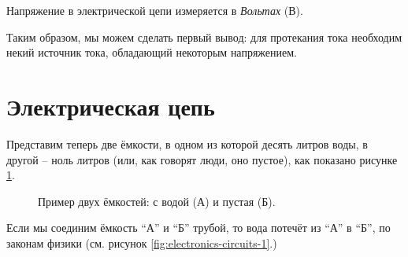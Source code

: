 \documentclass[a4paper,twoside]{book}
\begin{document}
Напряжение в электрической цепи измеряется в \emph{Вольтах} (В).

Таким образом, мы можем сделать первый вывод: для протекания тока необходим
некий источник тока, обладающий некоторым напряжением.

\section{Электрическая цепь}

Представим теперь две ёмкости, в одном из которой десять литров воды, в другой
-- ноль литров (или, как говорят люди, оно пустое), как показано рисунке
\ref{fig:electronics-circuits-0}.

\begin{figure}[ht]
  \centering
  \caption{Пример двух ёмкостей: с водой (А) и пустая (Б).}
  \label{fig:electronics-circuits-0}
\end{figure}

Если мы соединим ёмкость ``А'' и ``Б'' трубой, то вода потечёт из ``А'' в ``Б'',
по законам физики (см. рисунок \ref{fig:electronics-circuits-1}.)
\end{document}
